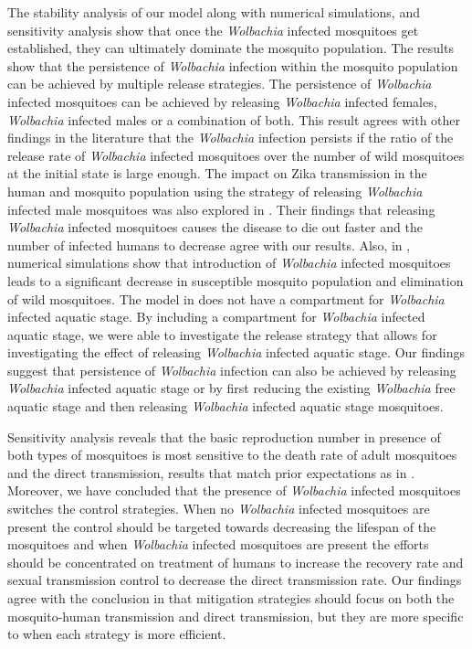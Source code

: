 \documentclass{ws-rv9x6}
\begin{document}
The stability analysis of our model along with numerical simulations, and sensitivity analysis show that once the \textit{Wolbachia} infected mosquitoes get established, they can ultimately dominate the mosquito population. The results show that the persistence of \textit{Wolbachia} infection within the mosquito population can be achieved by multiple release strategies. The persistence of \textit{Wolbachia} infected mosquitoes can be achieved by releasing \textit{Wolbachia} infected females, \textit{Wolbachia} infected males or a combination of both.  This result agrees with other findings in the literature \cite{wang2017modeling} that the \textit{Wolbachia} infection persists if the ratio of the release rate of \textit{Wolbachia} infected mosquitoes over the number of wild mosquitoes at the initial state is large enough. The impact on Zika transmission in the human and mosquito population using the strategy of releasing \textit{Wolbachia} infected male mosquitoes was also explored in \cite{xue2021releasing}. Their findings that releasing \textit{Wolbachia} infected mosquitoes causes the disease to die out faster and the number of infected humans to decrease agree with our results. Also, in \cite{xue2021releasing}, numerical simulations show  that introduction of \textit{Wolbachia} infected mosquitoes leads to a significant decrease in susceptible mosquito population and elimination of wild mosquitoes. The model in \cite{xue2021releasing} does not have a compartment for \textit{Wolbachia} infected aquatic stage. By including a compartment for \textit{Wolbachia} infected aquatic stage, we were able to investigate the release strategy that allows for investigating the effect of releasing \textit{Wolbachia} infected aquatic stage. Our findings suggest that persistence of \textit{Wolbachia} infection can also be achieved by releasing \textit{Wolbachia} infected aquatic stage or by first reducing the existing \textit{Wolbachia} free aquatic stage and then releasing \textit{Wolbachia} infected aquatic stage mosquitoes. 

Sensitivity analysis reveals that the basic reproduction number in presence of both types of mosquitoes is most sensitive to the death rate of adult mosquitoes and the direct transmission, results that match prior expectations as in \cite{xue2021releasing}. Moreover, we have concluded that the presence of \textit{Wolbachia} infected mosquitoes switches the control strategies. When no
\textit{Wolbachia} infected mosquitoes are present the control should be targeted towards decreasing the lifespan of the mosquitoes and when \textit{Wolbachia} infected mosquitoes are present the efforts should be concentrated on treatment of humans to increase the recovery rate and sexual transmission control to decrease the direct transmission rate. Our findings agree with the conclusion in \cite{xue2021releasing} that mitigation strategies should focus on both the mosquito-human transmission and direct transmission, but they are more specific to when each strategy is more efficient.
\end{document}
